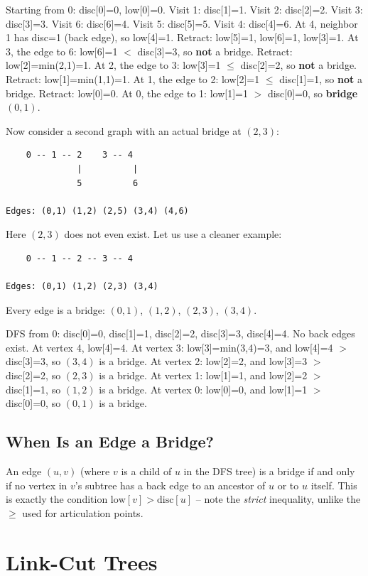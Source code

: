 Starting from 0: disc[0]=0, low[0]=0. Visit 1: disc[1]=1. Visit 2: disc[2]=2. Visit 3: disc[3]=3. Visit 6: disc[6]=4. Visit 5: disc[5]=5. Visit 4: disc[4]=6. At 4, neighbor 1 has disc=1 (back edge), so low[4]=1. Retract: low[5]=1, low[6]=1, low[3]=1. At 3, the edge to 6: low[6]=1 $<$ disc[3]=3, so \textbf{not} a bridge. Retract: low[2]=min(2,1)=1. At 2, the edge to 3: low[3]=1 $\le$ disc[2]=2, so \textbf{not} a bridge. Retract: low[1]=min(1,1)=1. At 1, the edge to 2: low[2]=1 $\le$ disc[1]=1, so \textbf{not} a bridge. Retract: low[0]=0. At 0, the edge to 1: low[1]=1 $>$ disc[0]=0, so \textbf{bridge} $(0,1)$.

Now consider a second graph with an actual bridge at $(2,3)$:

\begin{lstlisting}
    0 -- 1 -- 2    3 -- 4
              |          |
              5          6

Edges: (0,1) (1,2) (2,5) (3,4) (4,6)
\end{lstlisting}

Here $(2,3)$ does not even exist. Let us use a cleaner example:

\begin{lstlisting}
    0 -- 1 -- 2 -- 3 -- 4

Edges: (0,1) (1,2) (2,3) (3,4)
\end{lstlisting}

Every edge is a bridge: $(0,1)$, $(1,2)$, $(2,3)$, $(3,4)$.

DFS from 0: disc[0]=0, disc[1]=1, disc[2]=2, disc[3]=3, disc[4]=4. No back edges exist. At vertex 4, low[4]=4. At vertex 3: low[3]=min(3,4)=3, and low[4]=4 $>$ disc[3]=3, so $(3,4)$ is a bridge. At vertex 2: low[2]=2, and low[3]=3 $>$ disc[2]=2, so $(2,3)$ is a bridge. At vertex 1: low[1]=1, and low[2]=2 $>$ disc[1]=1, so $(1,2)$ is a bridge. At vertex 0: low[0]=0, and low[1]=1 $>$ disc[0]=0, so $(0,1)$ is a bridge.

\subsection{When Is an Edge a Bridge?}

An edge $(u, v)$ (where $v$ is a child of $u$ in the DFS tree) is a bridge if and only if no vertex in $v$'s subtree has a back edge to an ancestor of $u$ or to $u$ itself. This is exactly the condition $\text{low}[v] > \text{disc}[u]$ -- note the \emph{strict} inequality, unlike the $\ge$ used for articulation points.

\section{Link-Cut Trees}

